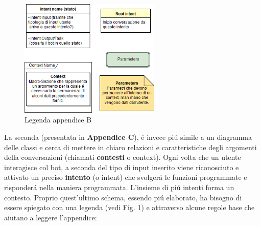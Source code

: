 \documentclass[]{article}
\begin{document}
\begin{figure}
  \vspace{-50pt}
  \hspace{-20pt}
  \begin{center}
    \includegraphics[width=0.6\textwidth]{flow2legend}
  \end{center}
  \vspace{-20pt}
  \caption{Legenda appendice B}
  \vspace{-10pt}
\end{figure}

La seconda (presentata in \textbf{Appendice C}), é invece piú simile a un diagramma delle classi e cerca di mettere in chiaro relazioni e caratteristiche degli argomenti della conversazioni (chiamati \textbf{contesti} o context). Ogni volta che un utente interagisce col bot, a seconda del tipo di input inserito viene riconosciuto e attivato un preciso \textbf{intento} (o intent) che svolgerá le funzioni programmate e risponderá nella maniera programmata. L'insieme di piú intenti forma un contesto. Proprio quest'ultimo schema, essendo piú elaborato, ha bisogno di essere spiegato con una legenda (vedi Fig. 1) e attraverso alcune  regole base che aiutano a leggere l'appendice:
\end{document}
